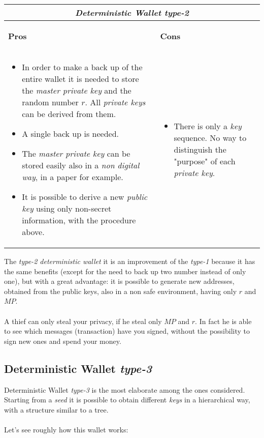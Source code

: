 \begin{center}
	\begin{tabular}{ |p{6cm}|p{6cm}|  }
		\hline
		\multicolumn{2}{|c|}{\textbf{\textit{Deterministic Wallet type-2}}} \\
		\hline \hline 
		\begin{center}
			\textbf{Pros}
		\end{center}&\begin{center}
			\textbf{Cons}
		\end{center}\\
		\hline
		\begin{itemize}
			\item In order to make a back up of the entire wallet it is needed to store the \textit{master private key} and the random number $r$. All \textit{private keys} can be derived from them.
			\item A single back up is needed.
			\item The \textit{master private key} can be stored easily also in a \textit{non digital way}, in a paper for example.
			\item It is possible to derive a new \textit{public key} using only non-secret information, with the procedure above.
		\end{itemize} &
		\begin{itemize}
			\item There is only a \textit{key} sequence. No way to distinguish the "purpose" of each \textit{private key}.
		\end{itemize}\\
		\hline
	\end{tabular}
\end{center}
The \textit{type-2 deterministic wallet} it is an improvement of the \textit{type-1} because it has the same benefits (except for the need to back up two number instead of only one), but with a great advantage: it is possible to generate new addresses, obtained from the public keys, also in a non safe environment, having only $r$ and $MP$. 
\\ \\
A thief can only steal your privacy, if he steal only $MP$ and $r$. In fact he is able to see which messages (transaction) have you signed, without the possibility to sign new ones and spend your money.

\subsection{Deterministic Wallet \textit{type-3}}
Deterministic Wallet \textit{type-3} is the most elaborate among the ones considered. Starting from a \textit{seed} it is possible to obtain different \textit{keys} in a hierarchical way, with a structure similar to a tree. 
\\ \\
Let's see roughly how this wallet works:

